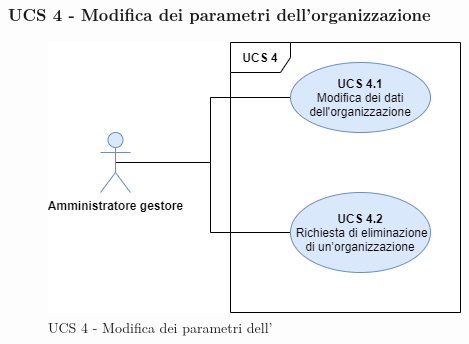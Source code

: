 \subsubsection{UCS 4 - Modifica dei parametri dell'organizzazione}%

\begin{figure}[h]
	\centering	
	\includegraphics[scale=0.53]{Sezioni/UseCase/Immagini/UCS4.png}
	\caption{UCS 4 - Modifica dei parametri dell'}
\end{figure}

